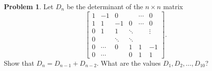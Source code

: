 \documentclass[12pt,reqno]{article}
\theoremstyle{definition}
\newtheorem{problem}{Problem}
\begin{document}
\newpage


\begin{problem} 
Let $D_n$ be the determinant of the $n\times n$ matrix
$$
\begin{bmatrix}
1 & -1 & 0 & & \cdots & 0 \\
1 & 1 & -1 & 0 & \cdots & 0 \\
0 & 1 & 1 & \ddots & & \vdots \\
0 & & \ddots & \ddots  & &\\
0 & \cdots & 0 & 1 & 1 & -1 \\
0 & \cdots & & 0 & 1 & 1
\end{bmatrix}.
$$
Show that $D_n = D_{n-1} + D_{n-2}$. What are the values $D_1, D_2, \ldots, D_{10}$?
\end{problem}
\end{document}
